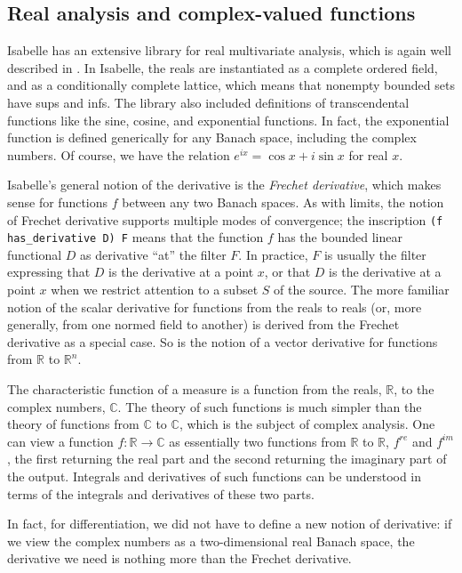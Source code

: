 \documentclass{svjour3}
\newcommand{\RR}{\mathbb{R}}
\newcommand{\CC}{\mathbb{C}}
\begin{document}
\subsection{Real analysis and complex-valued functions}
\label{subsection:real:analysis}

Isabelle has an extensive library for real multivariate analysis, which is again well described in \cite{hoelzl:et:al:13}. In Isabelle, the reals are instantiated as a complete ordered field, and as a conditionally complete lattice, which means that nonempty bounded sets have sups and infs. The library also included definitions of transcendental functions like the sine, cosine, and exponential functions. In fact, the exponential function is defined generically for any Banach space, including the complex numbers. Of course, we have the relation $e^{i x} = \cos x + i \sin x$ for real $x$.

Isabelle's general notion of the derivative is the \emph{Frechet derivative}, which makes sense for functions $f$ between any two Banach spaces. As with limits, the notion of Frechet derivative supports multiple modes of convergence; the inscription \verb=(f has_derivative D) F= means that the function $f$ has the bounded linear functional $D$ as derivative ``at'' the filter $F$. In practice, $F$ is usually the filter expressing that $D$ is the derivative at a point $x$, or that $D$ is the derivative at a point $x$ when we restrict attention to a subset $S$ of the source. The more familiar notion of the scalar derivative for functions from the reals to reals (or, more generally, from one normed field to another) is derived from the Frechet derivative as a special case. So is the notion of a vector derivative for functions from $\RR$ to $\RR^n$.

The characteristic function of a measure is a function from the reals, $\RR$, to the complex numbers, $\CC$. The theory of such functions is much simpler than the theory of functions from $\CC$ to $\CC$, which is the subject of complex analysis. One can view a function $f : \RR \to \CC$ as essentially two functions from $\RR$ to $\RR$, $f^\mathit{re}$ and $f^\mathit{im}$, the first returning the real part and the second returning the imaginary part of the output. Integrals and derivatives of such functions can be understood in terms of the integrals and derivatives of these two parts.

In fact, for differentiation, we did not have to define a new notion of derivative: if we view the complex numbers as a two-dimensional real Banach space, the derivative we need is nothing more than the Frechet derivative. 
\end{document}
